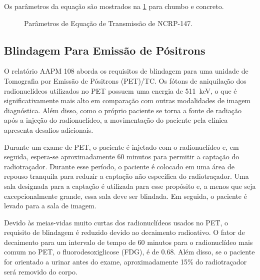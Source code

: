 \documentclass[11pt,a4paper]{article}
\begin{document}
	Os parâmetros da equação são mostrados na \ref{fig:prTransmiss} para chumbo e concreto.


		\begin{figure}[!h]
			\centering
			\caption{Parâmetros de Equação de Transmissão de NCRP-147.}
			\label{fig:prTransmiss}
		\end{figure}

\subsection*{Blindagem Para Emissão de Pósitrons}

	O relatório AAPM 108 aborda os requisitos de blindagem para uma unidade de Tomografia por Emissão de Pósitrons (PET)/TC. Os fótons de aniquilação dos radionuclídeos utilizados no PET possuem uma energia de \SI{511}{\kilo\electronvolt}, o que é significativamente mais alto em comparação com outras modalidades de imagem diagnóstica. Além disso, como o próprio paciente se torna a fonte de radiação após a injeção do radionuclídeo, a movimentação do paciente pela clínica apresenta desafios adicionais.

	Durante um exame de PET, o paciente é injetado com o radionuclídeo e, em seguida, espera-se aproximadamente 60 minutos para permitir a captação do radiotraçador. Durante esse período, o paciente é colocado em uma área de repouso tranquila para reduzir a captação não específica do radiotraçador. Uma sala designada para a captação é utilizada para esse propósito e, a menos que seja excepcionalmente grande, essa sala deve ser blindada. Em seguida, o paciente é levado para a sala de imagem.

	Devido às meias-vidas muito curtas dos radionuclídeos usados no PET, o requisito de blindagem é reduzido devido ao decaimento radioativo. O fator de decaimento para um intervalo de tempo de 60 minutos para o radionuclídeo mais comum no PET, o fluorodesoxiglicose (FDG), é de 0.68. Além disso, se o paciente for orientado a urinar antes do exame, aproximadamente 15\% do radiotraçador será removido do corpo.
\end{document}
